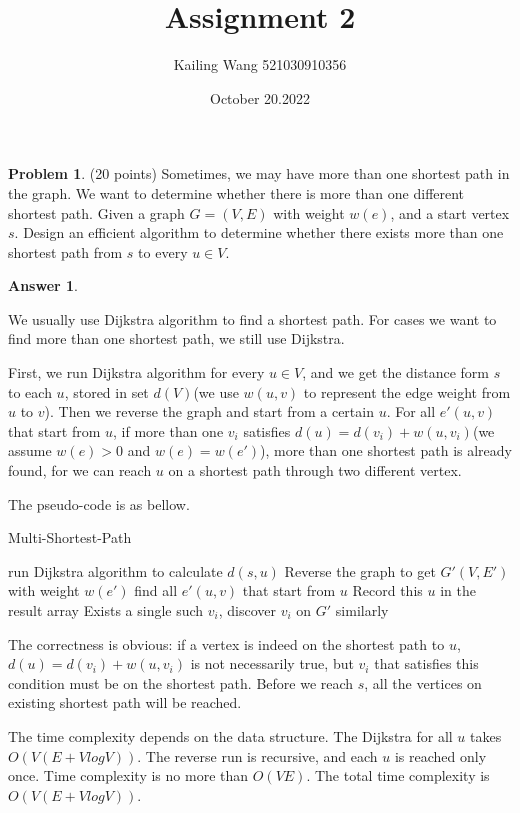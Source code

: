 \documentclass{article}
\theoremstyle{definition}
\newtheorem{prob}{Problem}
\newtheorem{ans}{Answer}
\begin{document}
	\title{Assignment 2}
	\author{Kailing Wang 521030910356}
	\date{October 20.2022}
\maketitle
\begin{prob}
	 (20 points) Sometimes, we may have more than one shortest path in the graph. We want to determine whether there is more than one different shortest path. Given a graph $G=(V, E)$ with weight $w(e)$, and a start vertex $s$. Design an efficient algorithm to determine whether there exists more than one shortest path from $s$ to every $u \in V$.
\end{prob}
\begin{ans}
	~
	
	We usually use Dijkstra algorithm to find a shortest path. For cases we want to find more than one shortest path, we still use Dijkstra.
	
	First, we run Dijkstra algorithm for every $u \in V$, and we get the distance form $s$ to each $u$, stored in set $d(V)$(we use $w(u,v)$ to represent the edge weight from $u$ to $v$). Then we reverse the graph and start from a certain $u$. For all $e'(u,v)$ that start from $u$, if more than one $v_i$ satisfies $d(u)=d(v_i)+w(u, v_i)$(we assume $w(e)>0$ and $w(e)=w(e')$), more than one shortest path is already found, for we can reach $u$ on a shortest path through two different vertex.
	
	The pseudo-code is as bellow. 
	
	\begin{algorithm}
		\caption{Multi-Shortest-Path}
		\BlankLine
		{
			run Dijkstra algorithm to calculate $d(s,u)$\;
		}
		Reverse the graph to get $G'(V,E')$ with weight $w(e')$\;
		{
			find all $e'(u,v)$ that start from $u$\;
			{Record this $u$ in the result array\;}
			{Exists a single such $v_i$, discover $v_i$ on $G'$ similarly\;
			}
		}
	\end{algorithm}

	The correctness is obvious: if a vertex is indeed on the shortest path to $u$, $d(u)=d(v_i)+w(u, v_i)$ is not necessarily true, but $v_i$ that satisfies this condition must be on the shortest path. Before we reach $s$, all the vertices on existing shortest path will be reached.
	
	The time complexity depends on the data structure. The Dijkstra for all $u$ takes $O(V(E + VlogV))$. The reverse run is recursive, and each $u$ is reached only once. Time complexity is no more than $O(VE)$. The total time complexity is $O(V(E + VlogV))$.
\end{ans}
\end{document}
